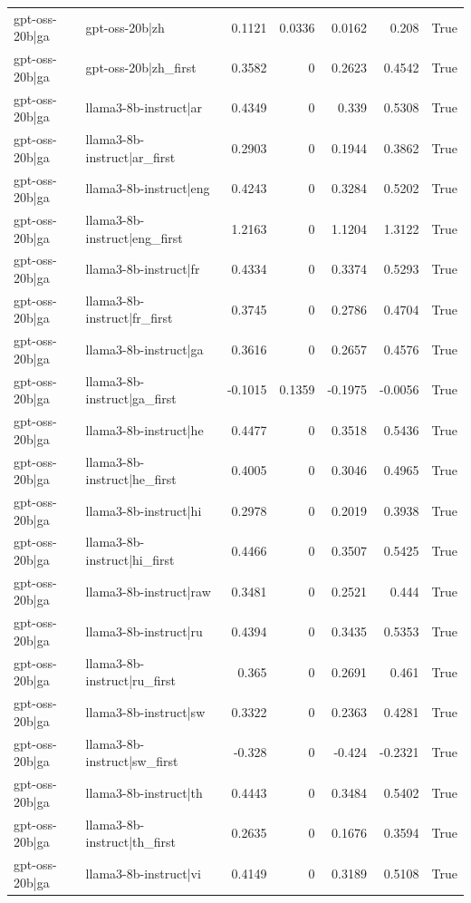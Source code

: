 \begin{table}
\begin{tabular}{l l r r r r l}
gpt-oss-20b|ga & gpt-oss-20b|zh & 0.1121 & 0.0336 & 0.0162 & 0.208 & True \\
gpt-oss-20b|ga & gpt-oss-20b|zh_first & 0.3582 & 0 & 0.2623 & 0.4542 & True \\
gpt-oss-20b|ga & llama3-8b-instruct|ar & 0.4349 & 0 & 0.339 & 0.5308 & True \\
gpt-oss-20b|ga & llama3-8b-instruct|ar_first & 0.2903 & 0 & 0.1944 & 0.3862 & True \\
gpt-oss-20b|ga & llama3-8b-instruct|eng & 0.4243 & 0 & 0.3284 & 0.5202 & True \\
gpt-oss-20b|ga & llama3-8b-instruct|eng_first & 1.2163 & 0 & 1.1204 & 1.3122 & True \\
gpt-oss-20b|ga & llama3-8b-instruct|fr & 0.4334 & 0 & 0.3374 & 0.5293 & True \\
gpt-oss-20b|ga & llama3-8b-instruct|fr_first & 0.3745 & 0 & 0.2786 & 0.4704 & True \\
gpt-oss-20b|ga & llama3-8b-instruct|ga & 0.3616 & 0 & 0.2657 & 0.4576 & True \\
gpt-oss-20b|ga & llama3-8b-instruct|ga_first & -0.1015 & 0.1359 & -0.1975 & -0.0056 & True \\
gpt-oss-20b|ga & llama3-8b-instruct|he & 0.4477 & 0 & 0.3518 & 0.5436 & True \\
gpt-oss-20b|ga & llama3-8b-instruct|he_first & 0.4005 & 0 & 0.3046 & 0.4965 & True \\
gpt-oss-20b|ga & llama3-8b-instruct|hi & 0.2978 & 0 & 0.2019 & 0.3938 & True \\
gpt-oss-20b|ga & llama3-8b-instruct|hi_first & 0.4466 & 0 & 0.3507 & 0.5425 & True \\
gpt-oss-20b|ga & llama3-8b-instruct|raw & 0.3481 & 0 & 0.2521 & 0.444 & True \\
gpt-oss-20b|ga & llama3-8b-instruct|ru & 0.4394 & 0 & 0.3435 & 0.5353 & True \\
gpt-oss-20b|ga & llama3-8b-instruct|ru_first & 0.365 & 0 & 0.2691 & 0.461 & True \\
gpt-oss-20b|ga & llama3-8b-instruct|sw & 0.3322 & 0 & 0.2363 & 0.4281 & True \\
gpt-oss-20b|ga & llama3-8b-instruct|sw_first & -0.328 & 0 & -0.424 & -0.2321 & True \\
gpt-oss-20b|ga & llama3-8b-instruct|th & 0.4443 & 0 & 0.3484 & 0.5402 & True \\
gpt-oss-20b|ga & llama3-8b-instruct|th_first & 0.2635 & 0 & 0.1676 & 0.3594 & True \\
gpt-oss-20b|ga & llama3-8b-instruct|vi & 0.4149 & 0 & 0.3189 & 0.5108 & True \\

\end{tabular}
\end{table}
